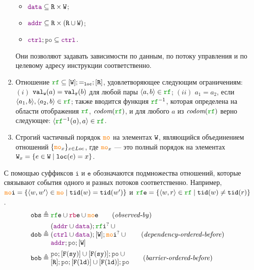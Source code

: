 \begin{definition}
\begin{enumerate}
\begin{itemize}
\item $\lDATA \suq \lR \times \lW$;
\item $\lADDR\suq \lR \times (\lR \cup \lW)$;
\item $\lCTRL;\lPO \suq \lCTRL$. 
\end{itemize}
Они позволяют задавать зависимости по данным, по потоку управления и по целевому адресу инструкции соответственно.
\item Отношение $\lRF \suq [\lW]; {=_\lLOC}; [\lR]$, удовлетворяющее следующим ограничениям:
$(i)$ ${\mathtt{val_w}}(a)={\mathtt{val_r}}(b)$ для любой пары $\tup{a,b}\in \lRF$;
$(ii)$ $a_1=a_2$, если $\tup{a_1,b},\tup{a_2,b}\in \lRF$; также вводится функция $\lRF^{-1}$, которая определена на
области отображения $\lRF$, $\codom{\lRF}$, и для любого $a$ из $\codom{\lRF}$ верно следующее: $\tup{\lRF^{-1}(a), a} \in \lRF$.
\item Строгий частичный порядок $\lCO$ на элементах ${\mathtt{W}}$,
      являющийся объединением отношений $\{\lCOx\}_{x\in\Loc}$,
      где $\lCOx$ --- это полный порядок на элементах ${\mathtt{W}}_x = \{ e \in {\mathtt{W}} \; | \; {\mathtt{loc}}(e) = x\}$.
\end{enumerate}
\end{definition}
\noindent
С помощью суффиксов $\mathtt{i}$ и $\mathtt{e}$ обозначаются подмножества отношений, которые связывают события одного
и разных потоков соответственно. 
Например, $\lCOI = \{ \tup{w, w'} \in \lCO \mid \lTID(w) = \lTID(w') \}$ и
$\lRFE = \{ \tup{w, r} \in \lRF \mid \lTID(w) \neq \lTID(r) \}$.
\begin{align*}
\lOBS &\defeq  \lRFE \cup \lFRE \cup \lCOE  \tag{\emph{observed-by}} \\
\lDOB &\defeq \inarr{(\lADDR \cup \lDATA); \lRFI^? \cup {} \\
	(\lCTRL \cup \lDATA); [\lW]; \lCOI^? \cup {} \\
	\lADDR; \lPO; [\lW]} \tag{\emph{dependency-ordered-before}} \\
\lBOB &\defeq \inarr{\lPO; [\lDMBSY] \cup [\lDMBSY]; \lPO  \cup {} \\
                    {} [\lR]; \lPO; [\lDMBLD] \cup [\lDMBLD]; \lPO} \tag{\emph{barrier-ordered-before}}
\end{align*}
